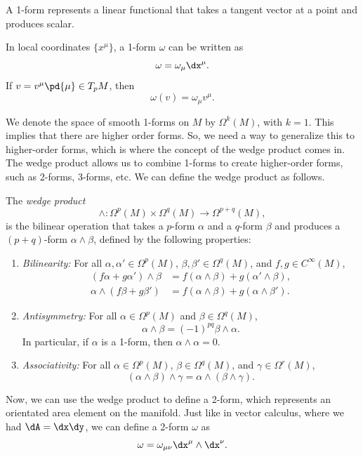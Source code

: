 A 1-form represents a linear functional that takes a tangent vector at a point and produces scalar.

\begin{example}
  In local coordinates $\{x^\mu\}$, a 1-form $\omega$ can be written as
  \[%
    \omega = \omega_\mu \dx^\mu
  .\]%
  If $v = v^\mu \pd{\mu} \in T_pM$, then
  \[%
    \omega(v) = \omega_\mu v^\mu
  .\]%
\end{example}

We denote the space of smooth 1-forms on $M$ by $\Omega^k(M)$, with $k = 1$. This implies that there are higher order forms. So, we need a way to generalize this to higher-order forms, which is where the concept of the wedge product comes in. The wedge product allows us to combine 1-forms to create higher-order forms, such as 2-forms, 3-forms, etc. We can define the wedge product as follows.

\begin{definition}
  The \emph{wedge product}
  \[%
    \wedge : \Omega^p(M) \times \Omega^q(M) \to \Omega^{p+q}(M)
  ,\]%
  is the bilinear operation that takes a $p$-form $\alpha$ and a $q$-form $\beta$ and produces a $(p+q)$-form $\alpha \wedge \beta$, defined by the following properties:
  \begin{enumerate}
    \item \emph{Bilinearity:} For all $\alpha, \alpha' \in \Omega^p(M)$, $\beta, \beta' \in \Omega^q(M)$, and $f, g \in C^\infty(M)$,
      \begin{align*}
        (f\alpha + g\alpha') \wedge \beta &= f(\alpha \wedge \beta) + g(\alpha' \wedge \beta), \\
        \alpha \wedge (f\beta + g\beta') &= f(\alpha \wedge \beta) + g(\alpha \wedge \beta').
      \end{align*}
    \item \emph{Antisymmetry:} For all $\alpha \in \Omega^p(M)$ and $\beta \in \Omega^q(M)$,
      \[%
        \alpha \wedge \beta = (-1)^{pq} \beta \wedge \alpha
      .\]%
      In particular, if $\alpha$ is a 1-form, then $\alpha \wedge \alpha = 0$.
    \item \emph{Associativity:} For all $\alpha \in \Omega^p(M)$, $\beta \in \Omega^q(M)$, and $\gamma \in \Omega^r(M)$,
      \[%
        (\alpha \wedge \beta) \wedge \gamma = \alpha \wedge (\beta \wedge \gamma)
      .\]%
  \end{enumerate}
\end{definition}

Now, we can use the wedge product to define a 2-form, which represents an orientated area element on the manifold. Just like in vector calculus, where we had $\dA = \dx\dy$, we can define a 2-form $\omega$ as
\[%
  \omega = \omega_{\mu\nu} \dx^\mu \wedge \dx^\nu
.\]%

